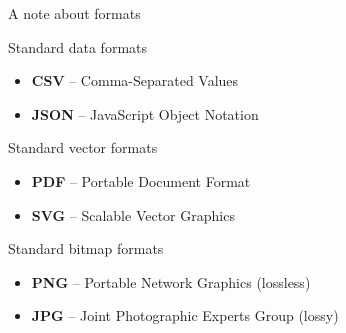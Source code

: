 \documentclass[10pt,aspectratio=169]{beamer}
\begin{document}
\begin{frame}{A note about formats}
  \begin{block}{Standard data formats}
    \vspace{0pt}
    \begin{itemize}
    \item[] \textbf{CSV} -- Comma-Separated Values
    \item[] \textbf{JSON} -- JavaScript Object Notation
    \end{itemize}
  \end{block}
  
  \begin{block}{Standard vector formats}
    \vspace{0pt}
    \begin{itemize}
    \item[] \textbf{PDF} -- Portable Document Format
    \item[] \textbf{SVG} -- Scalable Vector Graphics
    \end{itemize}
  \end{block}
  
  \begin{block}{Standard bitmap formats}
    \vspace{0pt}
    \begin{itemize}
    \item[] \textbf{PNG} -- Portable Network Graphics (lossless)
    \item[] \textbf{JPG} -- Joint Photographic Experts Group (lossy)
    \end{itemize}
  \end{block}

\end{frame}
\end{document}

